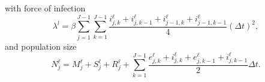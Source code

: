 \documentclass{jpmarticle}
\begin{document}
with force of infection
\begin{equation}
  \lambda^l =
  \beta
  \sum_{j = 1}^{J - 1}
  \sum_{k = 1}^{J - 1}
  \frac{i_{j, k}^{\ell}
    + i_{j, k - 1}^{\ell}
    + i_{j - 1, k}^{\ell}
    + i_{j - 1, k - 1}^{\ell}}
  {4}
  (\Delta t)^2,
\end{equation}
and population size
\begin{equation}
  N_j^{\ell} =
  M_j^{\ell} + S_j^{\ell} + R_j^{\ell}
  + \sum_{k = 1}^{J - 1}
  \frac{e_{j, k}^{\ell} + i_{j, k}^{\ell}
    + e_{j, k - 1}^{\ell} + i_{j, k - 1}^{\ell}}
  {2}
  \Delta t.
\end{equation}


\printbibliography
\end{document}
